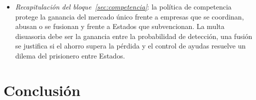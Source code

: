 \documentclass[11pt]{article}
\begin{document}
\begin{itemize}
\begin{itemize}
  \item \emph{a favor}: la escala importa en sectores de costes fijos enormes (semiconductores, defensa, telecomunicaciones), y el mercado relevante es cada vez más mundial;
  \item \emph{en contra}: el campeón protegido sube los precios en casa y no compite mejor fuera; la evidencia muestra que los mercados europeos se volvieron más competitivos que los estadounidenses gracias a su política de competencia \nocite{GutierrezPhilippon2023How}, y lo que impide crecer a las empresas europeas es la fragmentación del mercado, no el control de fusiones.
  \end{itemize}
\item \emph{Recapitulación del bloque~\ref{sec:competencia}}: la política de competencia protege la ganancia del mercado único frente a empresas que se coordinan, abusan o se fusionan y frente a Estados que subvencionan. La multa disuasoria debe ser la ganancia entre la probabilidad de detección, una fusión se justifica si el ahorro supera la pérdida y el control de ayudas resuelve un dilema del prisionero entre Estados.
\end{itemize}

\section*{Conclusión}
\end{document}

